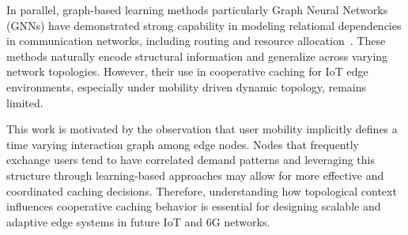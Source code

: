 In parallel, graph-based learning methods particularly Graph Neural Networks (GNNs) have demonstrated strong capability in modeling relational dependencies in communication networks, including routing and resource allocation~\cite{Rusek2019,Jiang2022Survey}. These methods naturally encode structural information and generalize across varying network topologies. However, their use in cooperative caching for IoT edge environments, especially under mobility driven dynamic topology, remains limited.

This work is motivated by the observation that user mobility implicitly defines a time varying interaction graph among edge nodes. Nodes that frequently exchange users tend to have correlated demand patterns and leveraging this structure through learning-based approaches may allow for more effective and coordinated caching decisions. Therefore, understanding how topological context influences cooperative caching behavior is essential for designing scalable and adaptive edge systems in future IoT and 6G networks.
